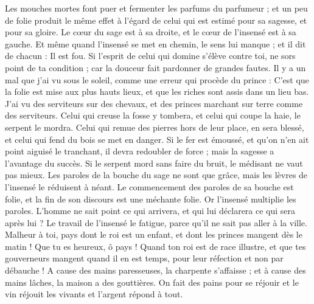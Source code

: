 \begin{multicols}{2}
\VerseOne{} Les mouches mortes font puer et fermenter les parfums du parfumeur ; et un peu de folie produit le même effet à l'égard de celui qui est estimé pour sa sagesse, et pour sa gloire.
Le cœur du sage est à sa droite, et le cœur de l'insensé est à sa gauche.
Et même quand l'insensé se met en chemin, le sens lui manque ; et il dit de chacun : Il est fou. 
Si l'esprit de celui qui domine s'élève contre toi, ne sors point de ta condition ; car la douceur fait pardonner de grandes fautes. 
Il y a un mal que j'ai vu sous le soleil, comme une erreur qui procède du prince :
C'est que la folie est mise aux plus hauts lieux, et que les riches sont assis dans un lieu bas. 
J'ai vu des serviteurs sur des chevaux, et des princes marchant sur terre comme des serviteurs.
Celui qui creuse la fosse y tombera, et celui qui coupe la haie, le serpent le mordra.
Celui qui remue des pierres hors de leur place, en sera blessé, et celui qui fend du bois se met en danger.
Si le fer est émoussé, et qu'on n'en ait point aiguisé le tranchant, il devra redoubler de force ; mais la sagesse a l'avantage du succès.
Si le serpent mord sans faire du bruit, le médisant ne vaut pas mieux. 
Les paroles de la bouche du sage ne sont que grâce, mais les lèvres de l'insensé le réduisent à néant.
Le commencement des paroles de sa bouche est folie, et la fin de son discours est une méchante folie.
Or l'insensé multiplie les paroles. L'homme ne sait point ce qui arrivera, et qui lui déclarera ce qui sera après lui ?
Le travail de l'insensé le fatigue, parce qu'il ne sait pas aller à la ville.
Malheur à toi, pays dont le roi est un enfant, et dont les princes mangent dès le matin !
Que tu es heureux, ô pays ! Quand ton roi est de race illustre, et que tes gouverneurs mangent quand il en est temps, pour leur réfection et non par débauche ! 
A cause des mains paresseuses, la charpente s'affaisse ; et à cause des mains lâches, la maison a des gouttières.
On fait des pains pour se réjouir et le vin réjouit les vivants et l'argent répond à tout.

\end{multicols}
